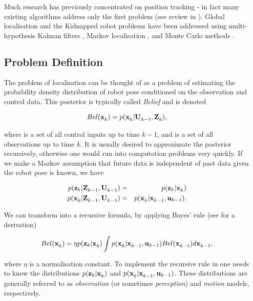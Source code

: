 Much research has previously concentrated on position tracking - in
fact many existing algorithms address only the first problem (see
review in \cite{Borenstein96}). Global localisation and the Kidnapped
robot problems have been addressed using multi-hypothesis Kalman
filters \cite{JensfeltKristensen01,Cox94}, Markov localisation
\cite{Fox99}, and Monte Carlo methods \cite{Thrun00j}.


\subsection{Problem Definition}

The problem of localisation can be thought of as a problem of
estimating the probability density distribution of robot pose
conditioned on the observation and control data.  This posterior is
typically called {\it Belief} and is denoted

\begin{equation}
  Bel(\x{k}{}{}) = p(\x{k}{}{} | \Uall{k-1}{}, \Zall{k}{}),
\label{eqn:localise_belief}
\end{equation}

where  is a set of all control inputs up to time $k-1$, and
 is a set of all observations up to time $k$. It is usually
desired to approximate the posterior recursively, otherwise one would
run into computation problems very quickly.  If we make a Markov
assumption that future data is independent of past data given the
robot pose is known, we have

\begin{eqnarray}
 p(\z{k} | \Zall{k-1}{}, \Uall{k-1}{})    &=& p(\z{k} | \x{k}{}{}) \\
 p(\x{k}{}{} | \Zall{k-1}{}, \Uall{k-1}{})&=& p(\x{k}{}{} | \x{k-1}{}{}, \U{k-1}{}).
\end{eqnarray}

We can transform  into a recursive
formula, by applying Bayes' rule (see \cite{Thrun00j} for a derivation)

\begin{equation}
Bel(\x{k}{}{}) = \eta p(\z{k} | \x{k}{}{}) \int 
                     p(\x{k}{}{} | \x{k-1}{}{}, \U{k-1}{}) 
                     Bel(\x{k-1}{}{}) d \x{k-1}{}{},
\label{eqn:localise_recursion}
\end{equation}

where $\eta$ is a normalisation constant. To implement the recursive
rule in  one needs to know the
distributions $p(\z{k} | \x{k}{}{})$ and $p(\x{k}{}{} | \x{k-1}{}{},
\U{k-1}{})$. These distributions are generally referred to as {\it
observation} (or sometimes {\it perception}) and {\it motion} models,
respectively. 

